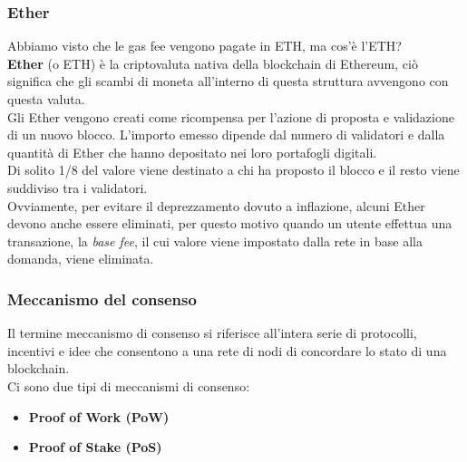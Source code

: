 \subsubsection{Ether}
Abbiamo visto che le gas fee vengono pagate in ETH, ma cos'è l'ETH? \\
\textbf{Ether} (o ETH) è la criptovaluta nativa della blockchain di Ethereum, ciò
significa che gli scambi di moneta all'interno di questa struttura avvengono
con questa valuta. \\
Gli Ether vengono creati come ricompensa per l'azione di proposta e validazione
di un nuovo blocco. L'importo emesso dipende dal numero di validatori e dalla
quantità di Ether che hanno depositato nei loro portafogli digitali. \\
Di solito 1/8 del valore viene destinato a chi ha proposto il blocco e il resto
viene suddiviso tra i validatori. \\
Ovviamente, per evitare il deprezzamento dovuto a inflazione, alcuni Ether 
devono anche essere eliminati, per questo motivo quando un utente effettua
una transazione, la \textit{base fee}, il cui valore viene impostato dalla
rete in base alla domanda, viene eliminata.

\subsubsection{Meccanismo del consenso}
Il termine meccanismo di consenso si riferisce all'intera serie di protocolli,
incentivi e idee che consentono a una rete di nodi di concordare lo stato di
una blockchain. \\
Ci sono due tipi di meccanismi di consenso: 
\begin{itemize}
    \item \textbf{Proof of Work (PoW)}
    \item \textbf{Proof of Stake (PoS)}
\end{itemize}

